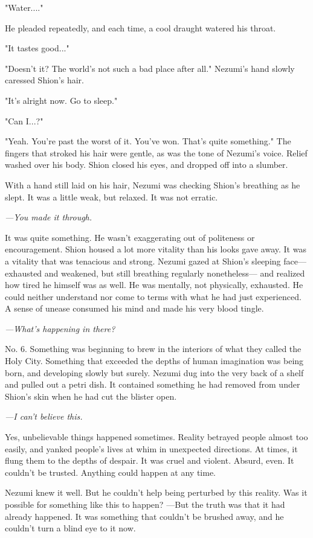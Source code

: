 "Water...."

He pleaded repeatedly, and each time, a cool draught watered his throat.

"It tastes good..."

"Doesn't it? The world's not such a bad place after all." Nezumi's hand
slowly caressed Shion's hair.

"It's alright now. Go to sleep."

"Can I...?"

"Yeah. You're past the worst of it. You've won. That's quite something."
The fingers that stroked his hair were gentle, as was the tone of
Nezumi's voice. Relief washed over his body. Shion closed his eyes, and
dropped off into a slumber.

\mybreak

With a hand still laid on his hair, Nezumi was checking Shion's
breathing as he slept. It was a little weak, but relaxed. It was not
erratic.

\emph{---You made it through.}

It was quite something. He wasn't exaggerating out of politeness or
encouragement. Shion housed a lot more vitality than his looks gave
away. It was a vitality that was tenacious and strong. Nezumi gazed at
Shion's sleeping face--- exhausted and weakened, but still breathing
regularly nonetheless--- and realized how tired he himself was as well. He
was mentally, not physically, exhausted. He could neither understand nor
come to terms with what he had just experienced. A sense of unease
consumed his mind and made his very blood tingle.

\emph{---What's happening in there?}

No. 6. Something was beginning to brew in the interiors of what they
called the Holy City. Something that exceeded the depths of human
imagination was being born, and developing slowly but surely. Nezumi dug
into the very back of a shelf and pulled out a petri dish. It contained
something he had removed from under Shion's skin when he had cut the
blister open.

\emph{---I can't believe this.}

Yes, unbelievable things happened sometimes. Reality betrayed people
almost too easily, and yanked people's lives at whim in unexpected
directions. At times, it flung them to the depths of despair. It was
cruel and violent. Absurd, even. It couldn't be trusted. Anything could
happen at any time.

Nezumi knew it well. But he couldn't help being perturbed by this
reality. Was it possible for something like this to happen? ---But the
truth was that it had already happened. It was something that couldn't
be brushed away, and he couldn't turn a blind eye to it now.

